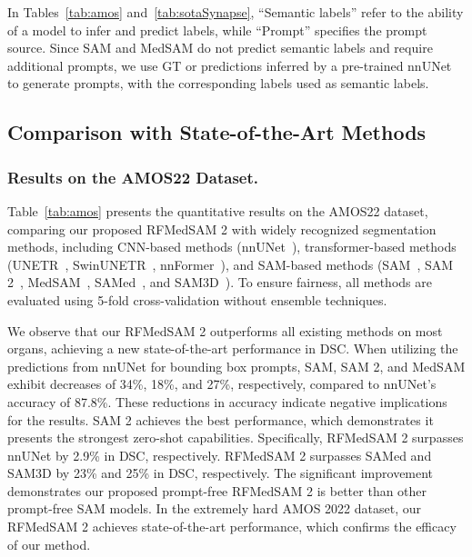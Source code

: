 In Tables~\ref{tab:amos} and~\ref{tab:sotaSynapse}, ``Semantic labels'' refer to the ability of a model to infer and predict labels, while ``Prompt'' specifies the prompt source. Since SAM and MedSAM do not predict semantic labels and require additional prompts, we use GT or predictions inferred by a pre-trained nnUNet to generate prompts, with the corresponding labels used as semantic labels.


\subsection{Comparison with State-of-the-Art Methods}

\subsubsection{Results on the AMOS22 Dataset.} 
Table~\ref{tab:amos} presents the quantitative results on the AMOS22 dataset, comparing our proposed RFMedSAM 2 with widely recognized segmentation methods, including CNN-based methods (nnUNet~\cite{isensee2019automated}), transformer-based methods (UNETR~\cite{hatamizadeh2022unetr}, SwinUNETR~\cite{hatamizadeh2021swin}, nnFormer~\cite{zhou2021nnformer}), and SAM-based methods (SAM~\cite{kirillov2023segment}, SAM 2~\cite{ravi2024sam}, MedSAM~\cite{ma2024segment}, SAMed~\cite{zhang2023customized}, and SAM3D~\cite{bui2024sam3d}). To ensure fairness, all methods are evaluated using 5-fold cross-validation without ensemble techniques.

We observe that our RFMedSAM 2 outperforms all existing methods on most organs, achieving a new state-of-the-art performance in DSC. When utilizing the predictions from nnUNet for bounding box prompts, SAM, SAM 2, and MedSAM exhibit decreases of 34\%, 18\%, and 27\%, respectively, compared to nnUNet's accuracy of 87.8\%. These reductions in accuracy indicate negative implications for the results. SAM 2 achieves the best performance, which demonstrates it presents the strongest zero-shot capabilities. Specifically, RFMedSAM 2 surpasses nnUNet by 2.9\% in DSC, respectively. RFMedSAM 2 surpasses SAMed and SAM3D by 23\% and 25\% in DSC, respectively. The significant improvement demonstrates our proposed prompt-free RFMedSAM 2 is better than other prompt-free SAM models.
In the extremely hard AMOS 2022 dataset, our RFMedSAM 2 achieves state-of-the-art performance, which confirms the efficacy of our method. 

